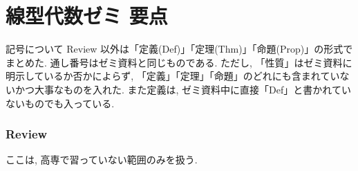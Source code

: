 \documentclass[a4j,dvipdfmx]{jsarticle}
\theoremstyle{mystyle}
\begin{document}
\part*{線型代数ゼミ 要点}
\begin{itembox}{記号について}
    Review 以外は「定義(Def)」「定理(Thm)」「命題(Prop)」の形式でまとめた. 通し番号はゼミ資料と同じものである. ただし, 「性質」はゼミ資料に明示しているか否かによらず, 「定義」「定理」「命題」のどれにも含まれていないかつ大事なものを入れた. また定義は, ゼミ資料中に直接「Def」と書かれていないものでも入っている.
\end{itembox}
\tableofcontents

\clearpage
\section{Review}
    ここは, 高専で習っていない範囲のみを扱う.
\end{document}
